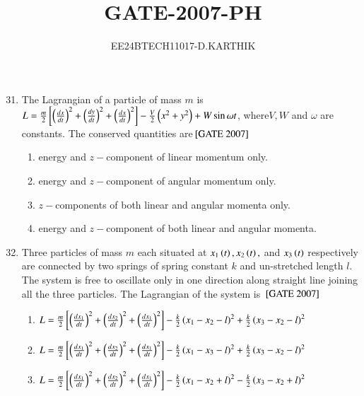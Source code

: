 \documentclass[journal]{IEEEtran}
\begin{document}

\vspace{3cm}

\title{GATE-2007-PH}
\author{EE24BTECH11017-D.KARTHIK}
\maketitle

\renewcommand{\thefigure}{\theenumi}
\renewcommand{\thetable}{\theenumi}
\setlength{\intextsep}{10pt}


\renewcommand{\thetable}{\theenumi}

\begin{enumerate}
\setcounter{enumi}{30}  
    \item The Lagrangian of a particle of mass $m$ is $L = \frac{m}{2}{}\left[\left(\frac{dx}{dt}\right)^2 +\left(\frac{dy}{dt}\right)^2 +\left(\frac{dx}{dt}\right)^2\right]-\frac{V}{2}\left(x^2+y^2\right)+W\sin{\omega t}$, where$V,W$ and $\omega$ are constants. The conserved quantities are\hfill{${}\left[\text{GATE 2007}\right]$} \begin{enumerate}
    \item energy and $z-$component of linear momentum only.
    \item energy and $z-$component of angular momentum only. 
    \item $z-$components of both linear and angular momenta only.
    \item energy and $z-$component of both linear and angular momenta.
\end{enumerate}
\item Three particles of mass $m$ each situated at $x_1\left(t\right), x_2\left(t\right),$ and $x_3\left(t\right)$ respectively are connected by two springs of spring constant $k$ and un-stretched length $l$. The system is free to oscillate only in one direction along straight line joining all the three particles. The Lagrangian of the system is \hfill{${}\left[\text{GATE 2007}\right]$} 
\begin{enumerate}
    \item $L = \frac{m}{2}{}\left[\left(\frac{dx_1}{dt}\right)^2 +\left(\frac{dx_2}{dt}\right)^2 +\left(\frac{dx_1}{dt}\right)^2\right]-\frac{k}{2}\left(x_1-x_2-l\right)^2 + \frac{k}{2}\left(x_3 - x_2 - l\right)^2$
     \item $L = \frac{m}{2}{}\left[\left(\frac{dx_1}{dt}\right)^2 +\left(\frac{dx_2}{dt}\right)^2 +\left(\frac{dx_1}{dt}\right)^2\right]-\frac{k}{2}\left(x_1-x_3-l\right)^2 + \frac{k}{2}\left(x_3 - x_2 - l\right)^2$
      \item $L = \frac{m}{2}{}\left[\left(\frac{dx_1}{dt}\right)^2 +\left(\frac{dx_2}{dt}\right)^2 +\left(\frac{dx_1}{dt}\right)^2\right]-\frac{k}{2}\left(x_1-x_2+l\right)^2 - \frac{k}{2}\left(x_3 - x_2 + l\right)^2$

\end{enumerate}
\end{enumerate}
\end{document}
